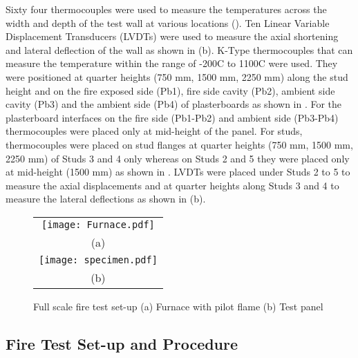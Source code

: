 Sixty four thermocouples were used to measure the temperatures across the width and depth of the test wall at various locations (). Ten Linear Variable Displacement Transducers (LVDTs) were used to measure the axial shortening and lateral deflection of the wall as shown in  (b). K-Type thermocouples that can measure the temperature within the range of -200\degree C to 1100\degree C were used. They were positioned at quarter heights (750 mm, 1500 mm, 2250 mm) along the stud height and on the fire exposed side (Pb1), fire side cavity (Pb2), ambient side cavity (Pb3) and the ambient side (Pb4) of plasterboards as shown in . For the plasterboard interfaces on the fire side (Pb1-Pb2) and ambient side (Pb3-Pb4) thermocouples were placed only at mid-height of the panel. For studs, thermocouples were placed on stud flanges at quarter heights (750 mm, 1500 mm, 2250 mm) of Studs 3 and 4 only whereas on Studs 2 and 5 they were placed only at mid-height (1500 mm) as shown in . LVDTs were placed under Studs 2 to 5 to measure the axial displacements and at quarter heights along Studs 3 and 4 to measure the lateral deflections as shown in (b).
\begin{figure}[!htbp]
	\centering
		\begin{tabular}{c}
		\texttt{[image: Furnace.pdf]} \\
		(a) \\
		\texttt{[image: specimen.pdf]}\\
		(b)  \\ 
		\end{tabular} 
		\caption{Full scale fire test set-up (a) Furnace with pilot flame (b) Test panel}
		\label{fig:furnace-specimen}
\end{figure}

\subsection{Fire Test Set-up and Procedure}\label{sec:fire test set-up procedure}

